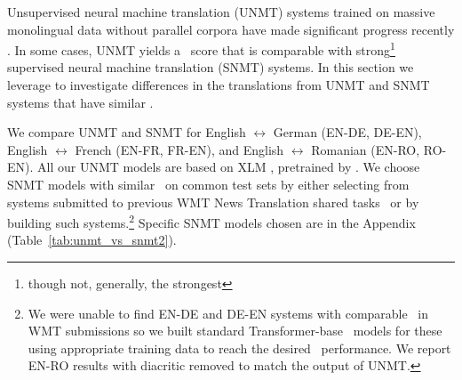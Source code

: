 

Unsupervised neural machine translation (UNMT) systems trained on massive monolingual data without parallel corpora have made significant progress recently \cite{Artetxe-2018-unmt-iclr,Lample-2018-unmt-iclr,lample-etal-2018-phrase-unmt,yang-etal-2018-unmt,conneau-NIPS2019-xlm,Song-2019-MASS,liu2020mbart}. 
In some cases, UNMT yields a \bleu\ score that is comparable with strong\footnote{though not, generally, the strongest} supervised neural machine translation (SNMT) systems. In this section we leverage  to investigate differences in the translations from UNMT and SNMT systems that have similar \bleu.

We compare UNMT and SNMT for English $\leftrightarrow$ German (EN-DE, DE-EN), English $\leftrightarrow$ French (EN-FR, FR-EN), and English $\leftrightarrow$ Romanian (EN-RO, RO-EN).
All our UNMT models are based on XLM \citep{conneau-NIPS2019-xlm}, pretrained by \citet{XLM-UNMT-Models20}. 
We choose SNMT models with similar \bleu\ on common test sets by either selecting from systems submitted to previous WMT News Translation shared tasks~\cite{bojar-EtAl:2014:W14-33,bojar-EtAl:2016:WMT1} or by building such systems.\footnote{We were unable to find EN-DE and DE-EN systems with comparable \bleu\ in WMT submissions so we built standard Transformer-base~\cite{vaswani2017attention} models for these using appropriate training data to reach the desired \bleu\ performance. We report EN-RO results with diacritic removed to match the output of UNMT.} Specific SNMT models chosen are in the Appendix (Table~\ref{tab:unmt_vs_snmt2}).

